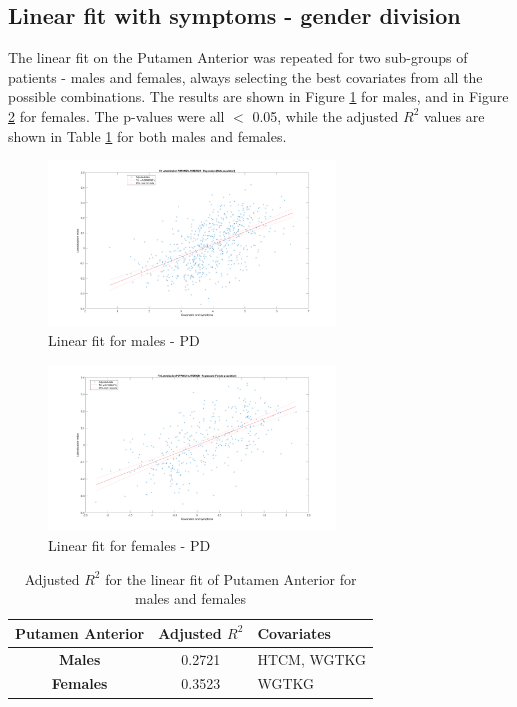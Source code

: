 \documentclass[]{article}
\begin{document}
\begin{multicols}{2}

\subsection{Linear fit with symptoms - gender division}

The linear fit on the Putamen Anterior was repeated for two sub-groups of patients - males and females, always selecting the best covariates from all the possible combinations. The results are shown in Figure \ref{fig:lin_fit_males} for males, and in Figure \ref{fig:lin_fit_females} for females. The p-values were all $<$ 0.05, while the adjusted $R^2$ values are shown in Table \ref{tbl:lin_fit_put_ant} for both males and females.

\end{multicols}

\begin{figure}[h]
\centering
\includegraphics[width=3in]{../fit_covariates_male}
\caption{Linear fit for males - PD}
\label{fig:lin_fit_males}
\end{figure} 

\begin{figure}[h]
	\centering
	\includegraphics[width=3in]{../fit_covariates_female}
	\caption{Linear fit for females - PD}
	\label{fig:lin_fit_females}
\end{figure} 

\begin{table}[h]
	\centering
	\begin{tabular}{|c|c|l|}
		\hline
		\textbf{Putamen Anterior} & \textbf{Adjusted $R^2$} & \textbf{Covariates} \\ \hline
		\textbf{Males}            & 0.2721                  & HTCM, WGTKG         \\ \hline
		\textbf{Females}          & 0.3523                  & WGTKG               \\ \hline
	\end{tabular}
	\caption{Adjusted $R^2$ for the linear fit of Putamen Anterior for males and females}
	\label{tbl:lin_fit_put_ant}
\end{table}
\end{document}
